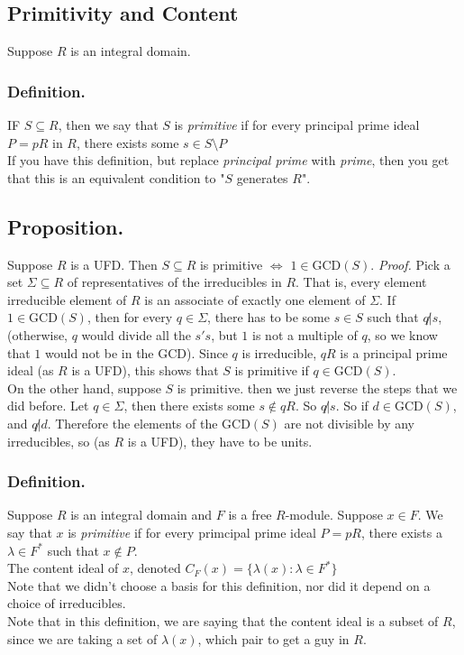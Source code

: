 \documentclass{article}
\newcommand{\vs}{\bigskip\\\text{}}
\newcommand{\beginproof}{\vspace{10pt}\newline\textit{Proof.}\hspace{1em}}
\begin{document}
\subsection{Primitivity and Content}
Suppose $R$ is an integral domain.
\subsubsection{Definition.}  IF $S \subseteq R$, then we say that $S$ is
\textit{primitive} if for every principal prime ideal $P = pR$ in $R$, there
exists some $s \in S\setminus P$\vs
If you have this definition, but replace \textit{principal prime} with
\textit{prime}, then you get that this is an equivalent condition to "$S$
generates $R$". 
\subsection{Proposition.} Suppose $R$ is a UFD. Then $S\subseteq R$ is primitive
$\iff$ $1 \in \text{GCD}(S)$. \beginproof
Pick a set $\Sigma \subseteq R$ of representatives of the irreducibles in $R$.
That is, every element irreducible element of $R$ is an associate of exactly one element of
$\Sigma$.
If $1 \in \text{GCD}(S)$, then for every $q \in \Sigma$, there has to be some $s\in S$
such that $q \not | s$, (otherwise, $q$ would divide all the $s's$, but $1$ is
not a multiple of $q$, so we know that $1$ would not be in the $\text{GCD}$). Since $q$
is irreducible, $qR$ is a principal prime ideal (as $R$ is a UFD), this shows
that $S$ is primitive if $q \in \text{GCD}(S)$.\vs
On the other hand, suppose $S$ is primitive. then we just reverse the steps that
we did before. Let $q \in \Sigma$, then there exists some $s\not\in qR$. So
$q\not | s$. So if $d \in \text{GCD}(S)$, and $q \not| d$. Therefore the elements of
the $\text{GCD}(S)$ are not divisible by any irreducibles, so (as $R$ is a UFD), they
have to be units.
\subsubsection{Definition.} Suppose $R$ is an integral domain and $F$ is a free
$R$-module. Suppose $x \in F$. We say that $x$ is \textit{primitive} if
for every primcipal prime ideal $P = pR$, there exists a $\lambda \in F^*$
such that $x\not \in P$. \vs
The content ideal of $x$, denoted $C_F(x) =\{\lambda(x): \lambda \in F^*\}$\vs
Note that we didn't choose a basis for this definition, nor did it depend on a
choice of irreducibles.\vs
Note that in this definition, we are saying that the content ideal is a subset
of $R$, since we are taking a set of $\lambda(x)$, which pair to get a guy in
$R$.
\end{document}
